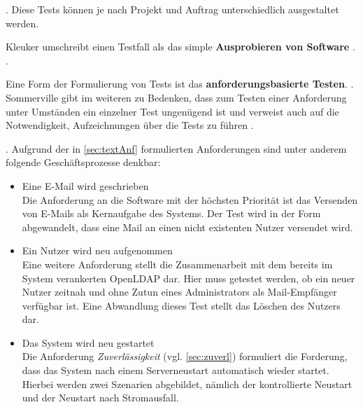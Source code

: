  \citep[][266]{Sommerville2012}. 
Diese Tests können je nach Projekt und Auftrag unterschiedlich ausgestaltet werden.  

Kleuker umschreibt einen Testfall als das simple \textbf{Ausprobieren von Software} \citep[vgl.][26]{Kleuker2019}. 
 \citep[][26]{Kleuker2019}.

Eine Form der Formulierung von Tests ist das \textbf{anforderungsbasierte Testen}.
 \citep[][266]{Sommerville2012}.
Sommerville gibt im weiteren zu Bedenken, dass zum Testen einer Anforderung unter Umständen ein einzelner Test ungenügend ist und verweist auch auf die Notwendigkeit, Aufzeichnungen über die Tests zu führen \citep[vgl.][27]{Kleuker2019}.

 \citep[][161]{Witte2019}. Aufgrund der in \autoref{sec:textAnf} formulierten Anforderungen sind unter anderem folgende Geschäftsprozesse denkbar:
\begin{itemize}
	\item Eine E-Mail wird geschrieben\\
	Die Anforderung an die Software mit der höchsten Priorität ist das Versenden von E-Mails als Kernaufgabe des Systems. Der Test wird  in der Form abgewandelt, dass eine Mail an einen nicht existenten Nutzer versendet wird.
	\item Ein Nutzer wird neu aufgenommen\\
	Eine weitere Anforderung stellt die Zusammenarbeit mit dem bereits im System verankerten OpenLDAP dar. Hier muss getestet werden, ob ein neuer Nutzer zeitnah und ohne Zutun eines Administrators als Mail-Empfänger verfügbar ist. Eine Abwandlung dieses Test stellt das Löschen des Nutzers dar.
	\item Das System wird neu gestartet \\
	Die Anforderung \textit{Zuverlässigkeit} (vgl. \autoref{sec:zuverl}) formuliert die Forderung, dass das System nach einem Serverneustart automatisch wieder startet. Hierbei werden zwei Szenarien abgebildet, nämlich der kontrollierte Neustart und der Neustart nach Stromausfall.
\end{itemize}


